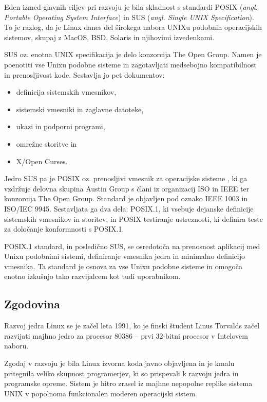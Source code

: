 \documentclass[a4paper,12pt,openright]{book}
\begin{document}
Eden izmed glavnih ciljev pri razvoju je bila skladnost s standardi POSIX (\textit{angl. Portable Operating System Interface}) in SUS (\textit{angl. Single UNIX Specification}).
To je razlog, da je Linux danes del širokega nabora UNIXu podobnih operacijskih sistemov, skupaj z MacOS, BSD, Solaris in njihovimi izvedenkami.

SUS oz. enotna UNIX specifikacija \cite{SUS_2020} je delo konzorcija The Open Group.
Namen je poenotiti vse Unixu podobne sisteme in zagotavljati medsebojno kompatibilnost in prenosljivost kode.
Sestavlja jo pet dokumentov:
\begin{itemize}
	\item definicija sistemskih vmesnikov,
	\item sistemski vmesniki in zaglavne datoteke,
	\item ukazi in podporni programi,
	\item omrežne storitve in
	\item X/Open Curses.
\end{itemize}

Jedro SUS pa je POSIX oz. prenosljivi vmesnik za operacijske sisteme \cite{POSIX.1_2024}, ki ga vzdržuje delovna skupina Austin Group s člani iz organizacij ISO in IEEE ter konzorcija The Open Group.
Standard je objavljen pod oznako IEEE 1003 in ISO/IEC 9945.
Sestavljata ga dva dela: POSIX.1, ki vsebuje dejanske definicije sistemskih vmesnikov in storitev, in POSIX testiranje ustreznosti, ki definira teste za določanje konformnosti s POSIX.1.

POSIX.1 standard, in posledično SUS, se osredotoča na prenosnost aplikacij med Unixu podobnimi sistemi, definiranje vmesnika jedra in minimalno definicijo vmesnika.
Ta standard je osnova za vse Unixu podobne sisteme in omogoča enotno izkušnjo tako razvijalcem kot tudi uporabnikom.

\subsection{Zgodovina}

Razvoj jedra Linux se je začel leta 1991, ko je finski študent Linus Torvalds začel razvijati majhno jedro za procesor 80386 -- prvi 32-bitni procesor v Intelovem naboru.

Zgodaj v razvoju je bila Linux izvorna koda javno objavljena in je kmalu pritegnila veliko skupnost programerjev, ki so prispevali k razvoju jedra in programske opreme.
Sistem je hitro zrasel iz majhne nepopolne replike sistema UNIX v popolnoma funkcionalen moderen operacijski sistem.
\end{document}
